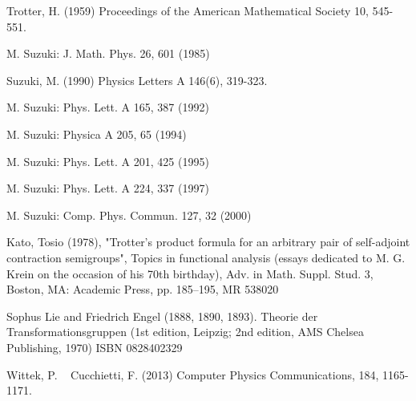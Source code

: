 \begin{thebibliography}{9}


  Trotter, H. (1959) Proceedings of the American Mathematical Society 10, 545-551.

M. Suzuki: J. Math. Phys. 26, 601 (1985)

Suzuki, M. (1990) Physics Letters A 146(6), 319-323.

M. Suzuki: Phys. Lett. A 165, 387 (1992)

M. Suzuki: Physica A 205, 65 (1994)

M. Suzuki: Phys. Lett. A 201, 425 (1995)

M. Suzuki: Phys. Lett. A 224, 337 (1997)

M. Suzuki: Comp. Phys. Commun. 127, 32 (2000)

Kato, Tosio (1978), "Trotter's product formula for an arbitrary pair of self-adjoint contraction semigroups", Topics in functional analysis (essays dedicated to M. G. Krein on the occasion of his 70th birthday), Adv. in Math. Suppl. Stud. 3, Boston, MA: Academic Press, pp. 185–195, MR 538020 

Sophus Lie and Friedrich Engel (1888, 1890, 1893). Theorie der Transformationsgruppen (1st edition, Leipzig; 2nd edition, AMS Chelsea Publishing, 1970) ISBN 0828402329

  Wittek, P. ~ Cucchietti, F. (2013) Computer Physics Communications, 184, 1165-1171.
  
\end{thebibliography}